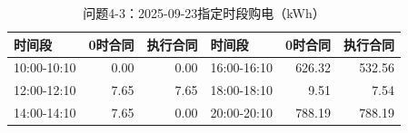 \begin{table}[H]\centering\small\caption{问题4-3：2025-09-23指定时段购电（kWh）}\label{tab:q4_320250923p}
\begin{tabular}{lrrlrr}\toprule
时间段 & 0时合同 & 执行合同 & 时间段 & 0时合同 & 执行合同\\\midrule
10:00-10:10 & 0.00 & 0.00 & 16:00-16:10 & 626.32 & 532.56\\
12:00-12:10 & 7.65 & 7.65 & 18:00-18:10 & 9.51 & 7.54\\
14:00-14:10 & 7.65 & 0.00 & 20:00-20:10 & 788.19 & 788.19\\
\bottomrule\end{tabular}\end{table}
